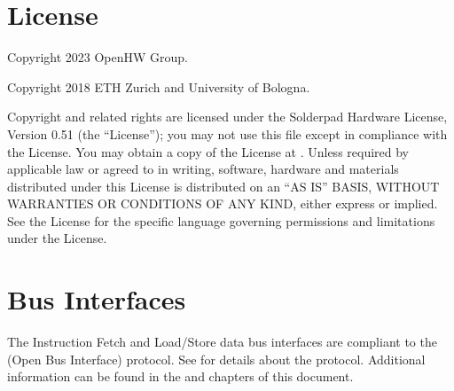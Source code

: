 \documentclass[letterpaper,10pt,english]{sphinxmanual}
\begin{document}
\section{License}
\label{\detokenize{intro:license}}
\sphinxAtStartPar
Copyright 2023 OpenHW Group.

\sphinxAtStartPar
Copyright 2018 ETH Zurich and University of Bologna.

\sphinxAtStartPar
Copyright and related rights are licensed under the Solderpad Hardware
License, Version 0.51 (the “License”); you may not use this file except
in compliance with the License. You may obtain a copy of the License at
. Unless required by applicable
law or agreed to in writing, software, hardware and materials
distributed under this License is distributed on an “AS IS” BASIS,
WITHOUT WARRANTIES OR CONDITIONS OF ANY KIND, either express or implied.
See the License for the specific language governing permissions and
limitations under the License.


\section{Bus Interfaces}
\label{\detokenize{intro:bus-interfaces}}
\sphinxAtStartPar
The Instruction Fetch and Load/Store data bus interfaces are compliant to the  (Open Bus Interface) protocol.
See  for details about the protocol.
Additional information can be found in the {\hyperref[\detokenize{instruction_fetch:instruction-fetch}]{}} and {\hyperref[\detokenize{load_store_unit:load-store-unit}]{}} chapters of this document.
\end{document}
